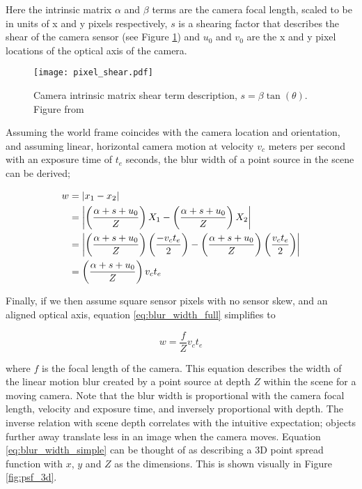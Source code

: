 Here the intrinsic matrix $\alpha$ and $\beta$ terms are the camera focal length, scaled to be in units of x and y pixels respectively, $s$ is a shearing factor that describes the shear of the camera sensor (see Figure \ref{fig:intrinsic_shear}) and $u_0$ and $v_0$ are the x and y pixel locations of the optical axis of the camera.

\begin{figure}[h]
\centering
\texttt{[image: pixel\_shear.pdf]}
\caption[Camera intrinsic matrix shear term]{Camera intrinsic matrix shear term description, $s = \beta\tan(\theta)$. Figure from \cite{pollefeys2002visual}}
\label{fig:intrinsic_shear}
\end{figure}

Assuming the world frame coincides with the camera location and orientation, and assuming linear, horizontal camera motion at velocity $v_c$ meters per second with an exposure time of $t_e$ seconds, the blur width of a point source in the scene can be derived;

\begin{align}
w &= \left| x_1 - x_2 \right| \notag \\
&= \left| \left( \frac{\alpha + s + u_0}{Z} \right) X_1 - \left( \frac{\alpha + s + u_0}{Z} \right) X_2 \right| \notag \\
&= \left| \left( \frac{\alpha + s + u_0}{Z} \right) \left(\frac{- v_c t_e}{2}\right) - \left( \frac{\alpha + s + u_0}{Z} \right) \left(\frac{v_c t_e}{2}\right) \right| \notag \\
\label{eq:blur_width_full}
&= \left( \frac{\alpha + s + u_0}{Z} \right) v_c t_e
\end{align}

Finally, if we then assume square sensor pixels with no sensor skew, and an aligned optical axis, equation \ref{eq:blur_width_full} simplifies to

\begin{equation}
\label{eq:blur_width_simple}
w = \frac{f}{Z} v_c t_e
\end{equation}

\noindent
where $f$ is the focal length of the camera.
This equation describes the width of the linear motion blur created by a point source at depth $Z$ within the scene for a moving camera.
Note that the blur width is proportional with the camera focal length, velocity and exposure time, and inversely proportional with depth.
The inverse relation with scene depth correlates with the intuitive expectation; objects further away translate less in an image when the camera moves.
Equation \ref{eq:blur_width_simple} can be thought of as describing a 3D point spread function with $x$, $y$ and $Z$ as the dimensions.
This is shown visually in Figure \ref{fig:psf_3d}.



